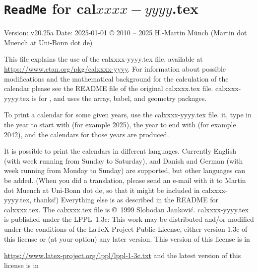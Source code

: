 \documentclass{article}[2024/06/29]%
\begin{document}
\section*{\texttt{ReadMe} for cal$xxxx-yyyy$.tex}
Version: v20.25a\newline
Date: 2025-01-01\newline
© 2010 -- 2025 H.-Martin Münch (Martin dot Muench at Uni-Bonn dot de)\newline

\noindent This file explains the use of the \textsf{calxxxx-yyyy.tex} file,
available at\newline
\url{https://www.ctan.org/pkg/calxxxx-yyyy}.\newline
\noindent For information about possible modifications and the mathematical background
for the calculation of the calendar please see the README file of the original
\textsf{calxxxx.tex} file. \textsf{calxxxx-yyyy.tex} is for \LaTeXe, and uses
the \textsf{array}, \textsf{babel}, and \textsf{geometry} packages.

\hspace*{-1.98471pt}To print a calendar for some given years,
use the \textsf{calxxxx-yyyy.tex} file. \LaTeXe{} it, type in the year to start with
(for example 2025), the year to end with (for example 2042), and the calendars
for those years are produced.

It is possible to print the calendars in different languages. Currently
English (with week running from Sunday to Saturday),
and Danish and German (with week running from Monday to Sunday) are supported,
but other languages can be added. (When you did a translation, please send
an e-mail with it to Martin dot Muench at Uni-Bonn dot de,
so that it might be included in \textsf{calxxxx-yyyy.tex}, thanks!)\newline
Everything else is as described in the README for \textsf{calxxxx.tex}.\newline
The \textsf{calxxxx.tex} file is ©~1999 Slobodan Janković.\newline
\textsf{calxxxx-yyyy.tex} is published under the LPPL~1.3c: This work may be
distributed and/or modified under the conditions of the \LaTeX{} Project
Public License, either version 1.3c of this license or (at your option) any
later version. This version of this license is in

\url{https://www.latex-project.org/lppl/lppl-1-3c.txt}\newline
and the latest version of this license is in
\end{document}
